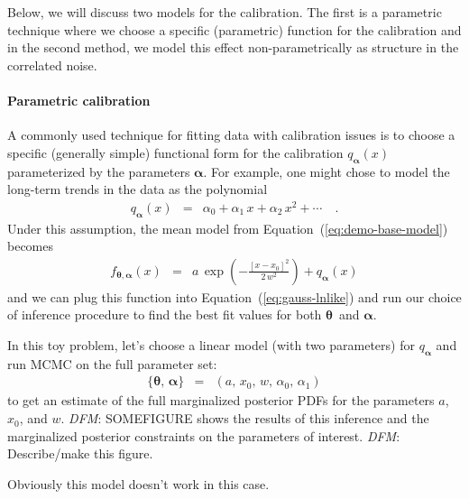 \documentclass[12pt,preprint]{aastex}
\newcommand{\Eq}[1]{Equation~(\ref{eq:#1})}
\newcommand{\eq}[1]{\Eq{#1}}
\newcommand{\eqlabel}[1]{\label{eq:#1}}
\newcommand{\bvec}[1]{{\ensuremath{\boldsymbol{#1}}}}
\newcommand{\todo}[3]{{\color{#2} \emph{#1}: #3}}
\newcommand{\dfmtodo}[1]{\todo{DFM}{red}{#1}}
\newcommand{\params}{{\ensuremath{\boldsymbol{\theta}}}}
\newcommand{\hyperpar}{{\ensuremath{\alpha}}}
\newcommand{\hyperpars}{{\ensuremath{\boldsymbol{\hyperpar}}}}
\begin{document}
Below, we will discuss two models for the calibration.
The first is a parametric technique where we choose a specific (parametric)
function for the calibration and in the second method, we model this effect
non-parametrically as structure in the correlated noise.

\paragraph{Parametric calibration}
A commonly used technique for fitting data with calibration issues is to
choose a specific (generally simple) functional form for the calibration
$q_\hyperpars(x)$ parameterized by the parameters \hyperpars.
For example, one might chose to model the long-term trends in the data as the
polynomial
\begin{eqnarray}
q_\hyperpars(x) &=& \hyperpar_0 + \hyperpar_1\,x + \hyperpar_2\,x^2 + \cdots
\quad.
\end{eqnarray}
Under this assumption, the mean model from \eq{demo-base-model} becomes
\begin{eqnarray}\eqlabel{demo-poly-model}
f_{\bvec{\theta},\bvec{\alpha}}(x) &=&
    a\,\exp\left(-\frac{[x - x_0]^2}{2\,w^2}\right)
    + q_\bvec{\alpha} (x)
\end{eqnarray}
and we can plug this function into \eq{gauss-lnlike} and run our choice of
inference procedure to find the best fit values for both \params\ and
\hyperpars.

In this toy problem, let's choose a linear model (with two parameters) for
$q_\bvec{\alpha}$ and run MCMC on the full parameter set:
\begin{eqnarray}
\{\params,\,\hyperpars\} &=& (a,\,x_0,\,w,\,\hyperpar_0,\,\hyperpar_1)
\end{eqnarray}
to get an estimate of the full marginalized posterior PDFs for the parameters
$a$, $x_0$, and $w$.
\dfmtodo{SOMEFIGURE} shows the results of this inference and the marginalized
posterior constraints on the parameters of interest.
\dfmtodo{Describe/make this figure.}

Obviously this model doesn't work in this case.
\end{document}
